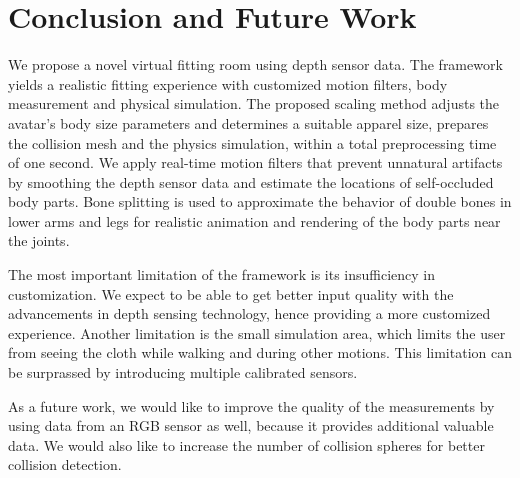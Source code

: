 \documentclass[number,preprint,review,12pt]{elsarticle}
\begin{document}
\clearpage

\section{Conclusion and Future Work}
\label{sec:Conclusions}

We propose a novel virtual fitting room using depth sensor data. The framework yields a realistic fitting experience with customized motion filters, body measurement and physical simulation. The proposed scaling method adjusts the avatar's body size parameters and determines a suitable apparel size, prepares the collision mesh and the physics simulation, within a total preprocessing time of one second. We apply real-time motion filters that prevent unnatural artifacts by smoothing the depth sensor data and estimate the locations of self-occluded body parts. Bone splitting is used to approximate the behavior of double bones in lower arms and legs for realistic animation and rendering of the body parts near the joints.

The most important limitation of the framework is its insufficiency in customization. We expect to be able to get better input quality with the advancements in depth sensing technology, hence providing a more customized experience. Another limitation is the small simulation area, which limits the user from seeing the cloth while walking and during other motions. This limitation can be surprassed by introducing multiple calibrated sensors.  

As a future work, we would like to improve the quality of the measurements by using data from an RGB sensor as well, because it provides additional valuable data. We would also like to increase the number of collision spheres for better collision detection.
 
\end{document}
